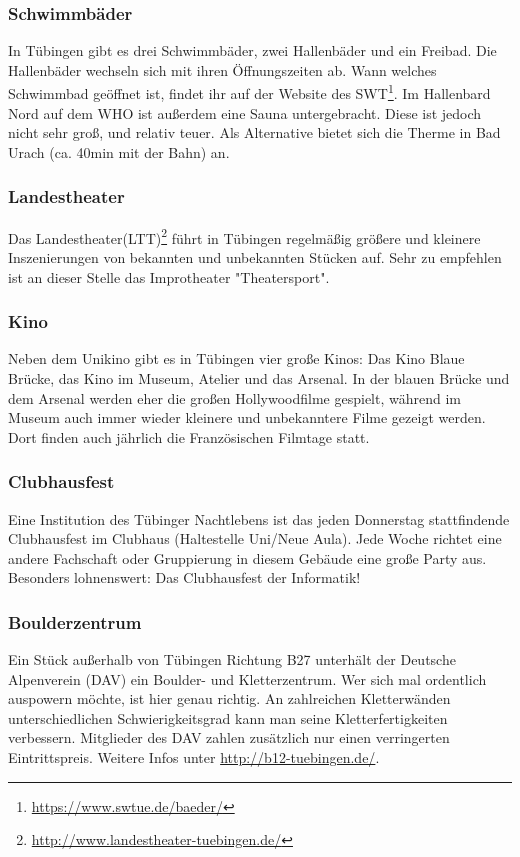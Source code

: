 \corona

\subsubsection*{Schwimmbäder}
In Tübingen gibt es drei Schwimmbäder, zwei Hallenbäder und ein Freibad. Die Hallenbäder wechseln sich mit ihren Öffnungszeiten ab. Wann welches Schwimmbad geöffnet ist, findet ihr auf der Website des SWT\footnote{\url{https://www.swtue.de/baeder/}}. Im Hallenbard Nord auf dem WHO ist außerdem eine Sauna untergebracht. Diese ist jedoch nicht sehr groß, und relativ teuer. Als Alternative bietet sich die Therme in Bad Urach (ca. 40min mit der Bahn) an.	%

\subsubsection*{Landestheater}
Das Landestheater(LTT)\footnote{\url{http://www.landestheater-tuebingen.de/}} führt in Tübingen regelmäßig größere und kleinere Inszenierungen von bekannten und unbekannten Stücken auf. Sehr zu empfehlen ist an dieser Stelle das Improtheater "Theatersport".	%

\subsubsection*{Kino}
Neben dem Unikino gibt es in Tübingen vier große Kinos: Das Kino Blaue Brücke, das Kino im Museum, Atelier und das Arsenal. In der blauen Brücke und dem Arsenal werden eher die großen Hollywoodfilme gespielt, während im Museum auch immer wieder kleinere und unbekanntere Filme gezeigt werden. Dort finden auch jährlich die Französischen Filmtage statt.

\subsubsection*{Clubhausfest}
Eine Institution des Tübinger Nachtlebens ist das jeden Donnerstag stattfindende Clubhausfest im Clubhaus (Haltestelle Uni/Neue Aula). Jede Woche richtet eine andere Fachschaft oder Gruppierung in diesem Gebäude eine große Party aus. Besonders lohnenswert: Das Clubhausfest der Informatik!

\subsubsection*{Boulderzentrum}
Ein Stück außerhalb von Tübingen Richtung B27 unterhält der Deutsche Alpenverein (DAV) ein Boulder- und Kletterzentrum. Wer sich mal ordentlich auspowern möchte, ist hier genau richtig. An zahlreichen Kletterwänden unterschiedlichen Schwierigkeitsgrad kann man seine Kletterfertigkeiten verbessern. Mitglieder des DAV zahlen zusätzlich nur einen verringerten Eintrittspreis. Weitere Infos unter \url{http://b12-tuebingen.de/}.	%
